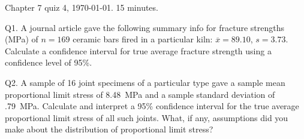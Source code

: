 \documentclass[12pt]{article}
\begin{document}
\thispagestyle{empty}

Chapter 7 quiz 4, \today. 15 minutes.
\bigskip

Q1.
A journal article gave the following summary info
for fracture strengths (MPa) of $n=169$ ceramic bars fired
in a particular kiln: $\overline{x} = 89.10$, $s = 3.73$.
Calculate a confidence interval for true average fracture strength using
a confidence level of 95\%.

\vskip3in

Q2.
A sample of 16 joint specimens of a particular type gave a sample mean
proportional limit stress of 8.48~MPa and a sample standard deviation of
.79~MPa.
Calculate and interpret a 95\% confidence interval for the true average
proportional limit stress of all such joints.
What, if any, assumptions did you make about the distribution of
proportional limit stress?
\end{document}
